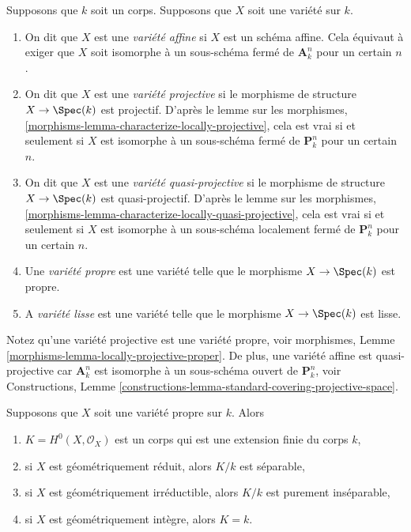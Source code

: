 \begin{definition}
\label{definition-variety-type}
Supposons que $k$ soit un corps. Supposons que $X$ soit une variété sur $k$.
\begin{enumerate}
\item On dit que $X$ est une {\it variété affine } si $X$ est
un schéma affine. Cela équivaut à exiger que $X$ soit
isomorphe à un sous-schéma fermé de $\mathbf{A}^n_k$ pour un
certain $n$. \item On dit que $X$ est une {\it variété
projective } si le morphisme de structure $X \to \Spec(k)$ est
projectif. D'après le lemme sur les morphismes,
\ref{morphisms-lemma-characterize-locally-projective}, cela est
vrai si et seulement si $X$ est isomorphe à un sous-schéma fermé
de $\mathbf{P}^n_k$ pour un certain $n$. \item On dit que $X$ est
une {\it variété quasi-projective } si le morphisme de structure
$X \to \Spec(k)$ est quasi-projectif. D'après le lemme sur les
morphismes,
\ref{morphisms-lemma-characterize-locally-quasi-projective}, cela est vrai
si et seulement si $X$ est isomorphe à un sous-schéma localement fermé de
$\mathbf{P}^n_k$ pour un certain $n$. \item Une {\it variété propre } est une
variété telle que le morphisme $X \to \Spec(k)$ est propre. \item A {\it
variété lisse } est une variété telle que le morphisme $X \to \Spec(k)$ est lisse.
\end{enumerate}
\end{definition}

\noindent
Notez qu'une variété projective est une variété propre,
voir morphismes, Lemme
\ref{morphisms-lemma-locally-projective-proper}. De plus, une
variété affine est quasi-projective car $\mathbf{A}^n_k$ est
isomorphe à un sous-schéma ouvert de $\mathbf{P}^n_k$, voir
Constructions, Lemme \ref{constructions-lemma-standard-covering-projective-space}.

\begin{lemma}
\label{lemma-regular-functions-proper-variety}
Supposons que $X$ soit une variété propre sur $k$. Alors
\begin{enumerate}
\item $K = H^0(X, \mathcal{O}_X)$ est un corps
qui est une extension finie du corps $k$, \item si
$X$ est géométriquement réduit, alors $K/k$ est
séparable, \item si $X$ est géométriquement
irréductible, alors $K/k$ est purement inséparable,
\item si $X$ est géométriquement intègre, alors $K = k$.
\end{enumerate}
\end{lemma}

